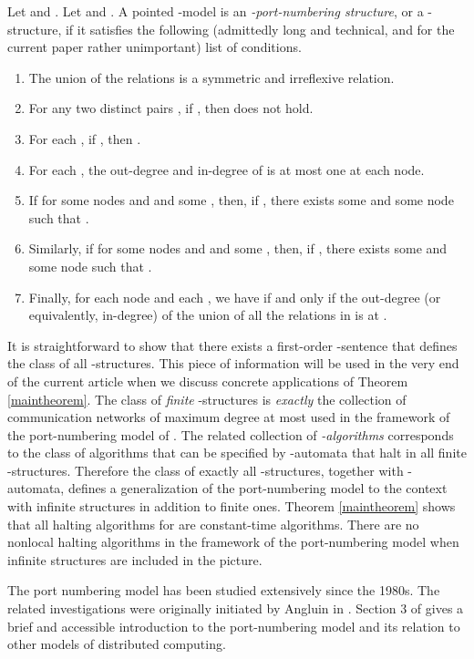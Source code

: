 \documentclass[copyright,creativecommons]{eptcs}
\begin{document}
Let  and .
Let  and .
A pointed -model  is an \emph{-port-numbering structure}, or a -structure,
if it satisfies the following (admittedly long and technical, and for the 
current paper rather unimportant) list of conditions.
\begin{enumerate}
\item
The union  of the relations  is a symmetric and irreflexive
relation.
\item
For any two distinct pairs , if , then  does not hold.
\item
For each , if , then .
\item
For each , the out-degree and in-degree of  is at most one at each node.
\item
If  for some nodes  and  and some ,
then, if , there exists some  and some node  such that .
\item
Similarly, if  for some nodes  and  and some ,
then, if , there exists some  and some node  such that . 
\item
Finally, for each node  and each , we have  if and only if the out-degree
(or equivalently, in-degree) of the union  of all the relations in  is  at .
\end{enumerate}




It is straightforward to show that there exists a first-order -sentence
 that defines the class  of all -structures.
This piece of information will be used in the very end of the current article when
we discuss concrete applications of Theorem \ref{maintheorem}\hspace{0.4mm}.
The class of \emph{finite}
-structures is \emph{exactly} the collection of communication networks of
maximum degree at most  used in the framework of 
the port-numbering model  of \cite{hella, hella2}.
The related collection of \emph{-algorithms}
corresponds to the class of algorithms that can be specified by -automata
that halt in all finite -structures.
Therefore the class  of 
exactly all -structures, together with -automata, defines a
generalization of the port-numbering model to the context with infinite structures in addition to
finite ones. Theorem \ref{maintheorem} shows that all halting algorithms for 
are constant-time algorithms.
There are no nonlocal halting algorithms in the framework of the port-numbering model when infinite structures are
included in the picture.




The port numbering model  has been studied
extensively since the 1980s. The related investigations
were originally initiated by Angluin in \cite{angluin}.
Section 3 of \cite{hella2} gives a brief and accessible
introduction to the port-numbering model and
its relation to other models of distributed computing.
\end{document}
